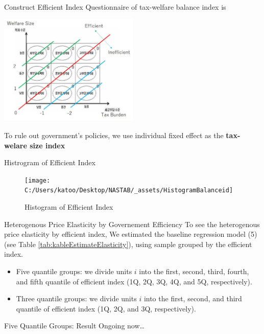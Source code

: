 \documentclass[
  ignorenonframetext,
]{beamer}
\providecommand{\tightlist}{%
  \setlength{\itemsep}{0pt}\setlength{\parskip}{0pt}}
\begin{document}
\begin{frame}{Construct Efficient Index}
\protect\hypertarget{construct-efficient-index}{}
Questionnaire of tax-welfare balance index is

\includegraphics[width=0.5\textwidth,height=\textheight]{_assets/BalanceQuestion.jpg}

To rule out government's policies, we use individual fixed effect as the
\textbf{tax-welare size index}
\end{frame}

\begin{frame}{Histrogram of Efficient Index}
\protect\hypertarget{histrogram-of-efficient-index}{}
\begin{figure}
\texttt{[image: C:/Users/katoo/Desktop/NASTAB/\_assets/HistogramBalanceid]} \caption{Histogram of Efficient Index}\label{fig:unnamed-chunk-4}
\end{figure}
\end{frame}

\begin{frame}{Heterogenous Price Elasticity by Governement Efficiency}
\protect\hypertarget{heterogenous-price-elasticity-by-governement-efficiency}{}
To see the heterogenous price elasticity by efficient index, We
estimated the baseline regression model (5) (see Table
\ref{tab:kableEstimateElasticity}), using sample grouped by the
efficient index.

\begin{itemize}
\tightlist
\item
  Five quantile groups: we divide units \(i\) into the first, second,
  third, fourth, and fifth quantile of efficient index (1Q, 2Q, 3Q, 4Q,
  and 5Q, respectively).
\item
  Three quantile groups: we divide units \(i\) into the first, second,
  and third quantile of efficient index (1Q, 2Q, and 3Q, respectively).
\end{itemize}
\end{frame}

\begin{frame}{Five Quantile Groups: Result}
\protect\hypertarget{five-quantile-groups-result-1}{}
Ongoing now\ldots{}
\end{frame}
\end{document}

